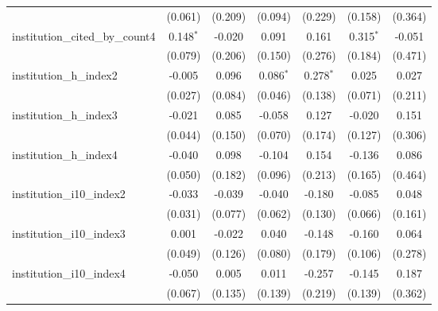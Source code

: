 \begin{tabular}{lcccccc}
                                         & (0.061)        & (0.209)       & (0.094)        & (0.229)        & (0.158)        & (0.364)\\   
   institution\_cited\_by\_count4        & 0.148$^{*}$    & -0.020        & 0.091          & 0.161          & 0.315$^{*}$    & -0.051\\   
                                         & (0.079)        & (0.206)       & (0.150)        & (0.276)        & (0.184)        & (0.471)\\   
   institution\_h\_index2                & -0.005         & 0.096         & 0.086$^{*}$    & 0.278$^{*}$    & 0.025          & 0.027\\   
                                         & (0.027)        & (0.084)       & (0.046)        & (0.138)        & (0.071)        & (0.211)\\   
   institution\_h\_index3                & -0.021         & 0.085         & -0.058         & 0.127          & -0.020         & 0.151\\   
                                         & (0.044)        & (0.150)       & (0.070)        & (0.174)        & (0.127)        & (0.306)\\   
   institution\_h\_index4                & -0.040         & 0.098         & -0.104         & 0.154          & -0.136         & 0.086\\   
                                         & (0.050)        & (0.182)       & (0.096)        & (0.213)        & (0.165)        & (0.464)\\   
   institution\_i10\_index2              & -0.033         & -0.039        & -0.040         & -0.180         & -0.085         & 0.048\\   
                                         & (0.031)        & (0.077)       & (0.062)        & (0.130)        & (0.066)        & (0.161)\\   
   institution\_i10\_index3              & 0.001          & -0.022        & 0.040          & -0.148         & -0.160         & 0.064\\   
                                         & (0.049)        & (0.126)       & (0.080)        & (0.179)        & (0.106)        & (0.278)\\   
   institution\_i10\_index4              & -0.050         & 0.005         & 0.011          & -0.257         & -0.145         & 0.187\\   
                                         & (0.067)        & (0.135)       & (0.139)        & (0.219)        & (0.139)        & (0.362)\\   

\end{tabular}

